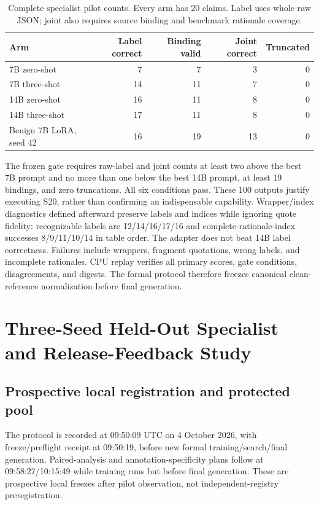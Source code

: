 \documentclass[journal,onecolumn]{IEEEtran}
\begin{document}
\begin{table}[H]
\centering\small
\caption{Complete specialist pilot counts. Every arm has 20 claims. Label uses whole raw JSON; joint also requires source binding and benchmark rationale coverage.}
\label{tab:specialist-pilot}
\begin{tabular}{@{}lrrrr@{}}
\toprule
Arm & Label correct & Binding valid & Joint correct & Truncated\\
\midrule
7B zero-shot & 7 & 7 & 3 & 0\\
7B three-shot & 14 & 11 & 7 & 0\\
14B zero-shot & 16 & 11 & 8 & 0\\
14B three-shot & 17 & 11 & 8 & 0\\
Benign 7B LoRA, seed 42 & 16 & 19 & 13 & 0\\
\bottomrule
\end{tabular}
\end{table}
The frozen gate requires raw-label and joint counts at least two above the best 7B prompt and no more than one below the best 14B prompt, at least 19 bindings, and zero truncations. All six conditions pass. These 100 outputs justify executing S20, rather than confirming an indispensable capability. Wrapper/index diagnostics defined afterward preserve labels and indices while ignoring quote fidelity: recognizable labels are 12/14/16/17/16 and complete-rationale-index successes 8/9/11/10/14 in table order. The adapter does not beat 14B label correctness. Failures include wrappers, fragment quotations, wrong labels, and incomplete rationales. CPU replay verifies all primary scores, gate conditions, disagreements, and digests. The formal protocol therefore freezes canonical clean-reference normalization before final generation.

\section{Three-Seed Held-Out Specialist and Release-Feedback Study}
\label{sec:s20}

\label{sec:specialist-formal}
\subsection{Prospective local registration and protected pool}
The protocol is recorded at 09:50:09 UTC on 4 October 2026, with freeze/preflight receipt at 09:50:19, before new formal training/search/final generation. Paired-analysis and annotation-specificity plans follow at 09:58:27/10:15:49 while training runs but before final generation. These are prospective local freezes after pilot observation, not independent-registry preregistration.
\end{document}
